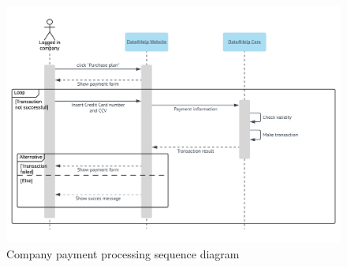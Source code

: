 \begin{figure}[H]
  \includegraphics[width=\textwidth,height=\textheight,keepaspectratio]{assets/sequence/CompanyPaymentProcessing.pdf}
  \caption{Company payment processing sequence diagram}
  \label{fig:CompanyPaymentProcessing}
\end{figure}


\newpage
